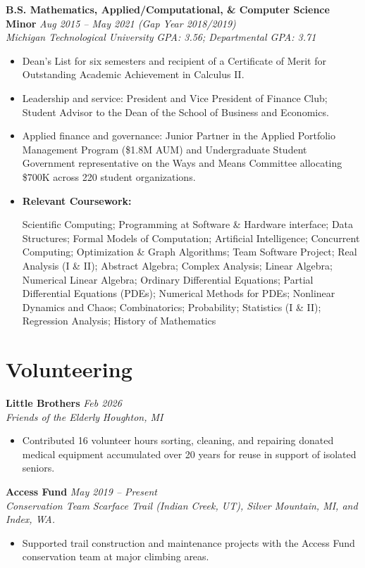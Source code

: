 \documentclass[10pt,letterpaper]{article}
\newcommand{\resumeItem}[1]{\item \small #1}
\newcommand{\resumeSubheading}[4]{%
  \textbf{#1} \hfill \small{\textit{#2}}\\
  \small{\textit{#3}} \hfill \small{\textit{#4}}\par
}
\newenvironment{courselist}[1][Relevant Coursework]{%
  \begin{minipage}[t]{\linewidth}%
    \textbf{#1:} \ignorespaces
}{%
  \end{minipage}%
}
\begin{document}
\resumeSubheading{B.S. Mathematics, Applied/Computational, \& Computer Science Minor}{Aug 2015 -- May 2021 (Gap Year 2018/2019)}{Michigan Technological University}{GPA: 3.56; Departmental GPA: 3.71}
\begin{itemize}
  \resumeItem{Dean's List for six semesters and recipient of a Certificate of Merit for Outstanding Academic Achievement in Calculus II.}
  \resumeItem{Leadership and service: President and Vice President of Finance Club; Student Advisor to the Dean of the School of Business and Economics.}
  \resumeItem{Applied finance and governance: Junior Partner in the Applied Portfolio Management Program (\$1.8M AUM) and Undergraduate Student Government representative on the Ways and Means Committee allocating \$700K across 220 student organizations.}
  \resumeItem{
  \begin{courselist}
    Scientific Computing; Programming at Software \& Hardware interface; Data Structures; Formal Models of Computation; Artificial Intelligence; Concurrent Computing;
    Optimization \& Graph Algorithms; Team Software Project; Real Analysis (I \& II); Abstract Algebra; Complex Analysis; Linear Algebra; Numerical Linear Algebra;
    Ordinary Differential Equations; Partial Differential Equations (PDEs); Numerical Methods for PDEs; Nonlinear Dynamics and Chaos; Combinatorics; Probability;
    Statistics (I \& II); Regression Analysis; History of Mathematics
  \end{courselist}}
\end{itemize}

\section*{Volunteering}
\resumeSubheading{Little Brothers}{Feb 2026}{Friends of the Elderly}{Houghton, MI}
\begin{itemize}
  \resumeItem{Contributed 16 volunteer hours sorting, cleaning, and repairing donated medical equipment accumulated over 20 years for reuse in support of isolated seniors.}
\end{itemize}

\resumeSubheading{Access Fund}{May 2019 -- Present}{Conservation Team}{Scarface Trail (Indian Creek, UT), Silver Mountain, MI, and Index, WA.}
\begin{itemize}
  \resumeItem{Supported trail construction and maintenance projects with the Access Fund conservation team at major climbing areas.}
\end{itemize}
\end{document}
